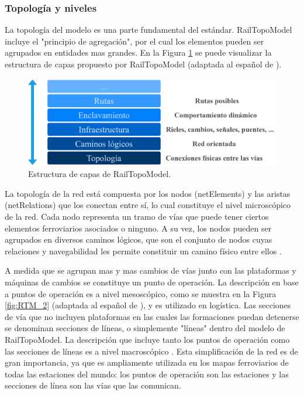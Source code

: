 \subsubsection{Topología y niveles}

    La topología del modelo es una parte fundamental del estándar. RailTopoModel incluye el "principio de agregación", por el cual los elementos pueden ser agrupados en entidades mas grandes. En la Figura \ref{fig:RTM_1} se puede visualizar la estructura de capas propuesto por RailTopoModel (adaptada al español de \cite{Paper_109}).

    \begin{figure}[H]
        \centering
        \includegraphics[width=1\textwidth]{Figuras/capas}
        \centering\caption{Estructura de capas de RailTopoModel.}
        \label{fig:RTM_1}
    \end{figure}
    
    La topología de la red está compuesta por los nodos (netElements) y las aristas (netRelations) que los conectan entre sí, lo cual constituye el nivel microscópico de la red. Cada nodo representa un tramo de vías que puede tener ciertos elementos ferroviarios asociados o ninguno. A su vez, los nodos pueden ser agrupados en diversos caminos lógicos, que son el conjunto de nodos cuyas relaciones y navegabilidad les permite constituir un camino físico entre ellos \cite{Paper_150}.

    A medida que se agrupan mas y mas cambios de vías junto con las plataformas y máquinas de cambios se constituye un punto de operación. La descripción en base a puntos de operación es a nivel mesoscópico, como se muestra en la Figura \ref{fig:RTM_2} (adaptada al español de \cite{Paper_109}), y es utilizado en logística. Las secciones de vía que no incluyen plataformas en las cuales las formaciones puedan detenerse se denominan secciones de líneas, o simplemente "líneas" dentro del modelo de RailTopoModel. La descripción que incluye tanto los puntos de operación como las secciones de líneas es a nivel macroscópico \cite{Paper_149}. Esta simplificación de la red es de gran importancia, ya que es ampliamente utilizada en los mapas ferroviarios de todas las estaciones del mundo: los puntos de operación son las estaciones y las secciones de línea son las vías que las comunican. 
    
